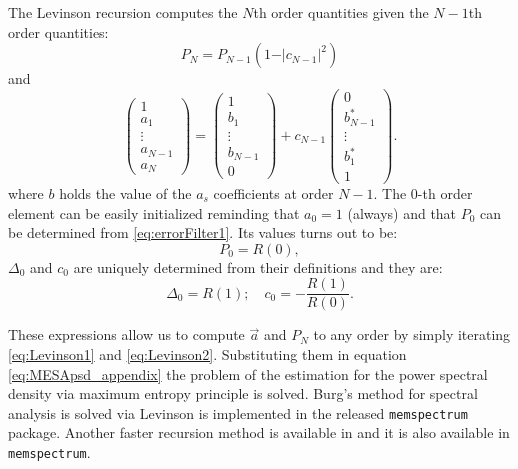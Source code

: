 \documentclass[epj,nopacs]{svjour}
\begin{document}
\begin{appendix}
The Levinson recursion computes the $N$th order quantities given the $N-1$th order quantities: 
\begin{equation} \label{eq:Levinson1}
P_N = P_{N -1}\left(1 - \vert c_{N - 1} \vert ^2\right)
\end{equation}
and 
\begin{equation} \label{eq:Levinson2}
\begin{pmatrix}
1 \\ a_1 \\ \vdots \\ a_{N - 1} \\ a_N
\end{pmatrix}
= 
\begin{pmatrix}
1 \\ b_1 \\ \vdots \\ b_{N -1} \\ 0
\end{pmatrix}
+ c_{N-1}
\begin{pmatrix}
0 \\ b_{N -1}^* \\ \vdots \\ b^*_1 \\ 1
\end{pmatrix}. 
\end{equation}
where $b$ holds the value of the $a_s$ coefficients at order $N-1$. 
The 0-th order element can be easily initialized reminding that $a_0 = 1$ (always) and that $P_0$ can be determined from \eqref{eq:errorFilter1}.
Its values turns out to be: 
\begin{equation}
P_0 = R(0),
\end{equation}
$\Delta_0$ and $c_0$ are uniquely determined from their definitions and they are:
\begin{equation}
\Delta_0 = R(1); \quad c_0 = -\frac{R(1)}{R(0)}. 
\end{equation}

These expressions allow us to compute $\vec a$ and $P_N$ to any order by simply iterating \eqref{eq:Levinson1} and \eqref{eq:Levinson2}. Substituting them in equation \eqref{eq:MESApsd_appendix} the problem of the estimation for the power spectral density via maximum entropy principle is solved.
Burg's method for spectral analysis is solved via Levinson is implemented in the released \texttt{memspectrum} package.
Another faster recursion method is available in \cite{Vos} and it is also available in \texttt{memspectrum}.

\end{appendix}
\end{document}
